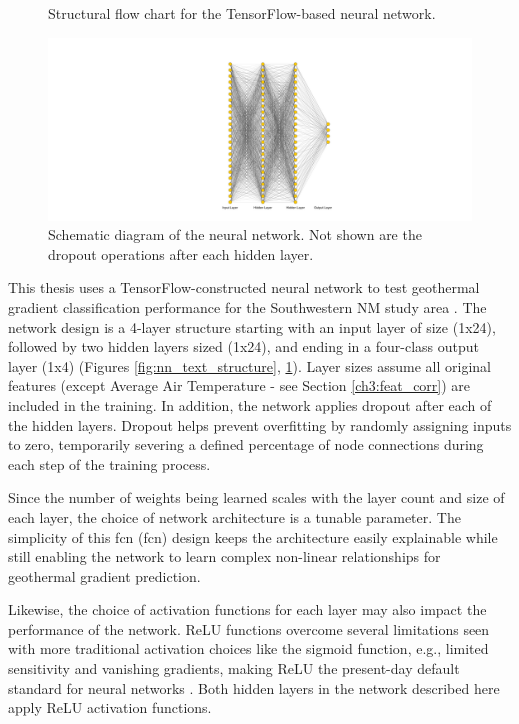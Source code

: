 \begin{figure}[!htp]
\begin{minipage}[b][][b]{.35\linewidth}
    \caption[Neural network structural flow]{Structural flow chart for the TensorFlow-based neural network.}
    \label{fig:nn_text_structure}
\end{minipage}
\hfill
\begin{minipage}[b][][b]{.61\linewidth}
    \includegraphics[width=\linewidth]{templates/images/Figure-ANN.pdf}
    \caption[Neural network structural schematic]{Schematic diagram of the neural network. Not shown are the dropout operations after each hidden layer.}
    \label{fig:nn_dot_structure}
\end{minipage}
\end{figure}
This thesis uses a TensorFlow-constructed neural network to test geothermal gradient classification performance for the Southwestern NM study area \citep{abadi_tensorflow_2016}. The network design is a 4-layer structure starting with an input layer of size (1x24), followed by two hidden layers sized (1x24), and ending in a four-class output layer (1x4) (Figures \ref{fig:nn_text_structure}, \ref{fig:nn_dot_structure}). Layer sizes assume all original features (except Average Air Temperature - see Section \ref{ch3:feat_corr}) are included in the training. In addition, the network applies dropout after each of the hidden layers. Dropout helps prevent overfitting by randomly assigning inputs to zero, temporarily severing a defined percentage of node connections during each step of the training process.

Since the number of weights being learned scales with the layer count and size of each layer, the choice of network architecture is a tunable parameter. The simplicity of this \acrlong{fcn} (\acrshort{fcn}) design keeps the architecture easily explainable while still enabling the network to learn complex non-linear relationships for geothermal gradient prediction.

Likewise, the choice of activation functions for each layer may also impact the performance of the network. ReLU functions overcome several limitations seen with more traditional activation choices like the sigmoid function, e.g., limited sensitivity and vanishing gradients, making ReLU the present-day default standard for neural networks \citep{brownlee_gentle_2019}. Both hidden layers in the network described here apply ReLU activation functions.

